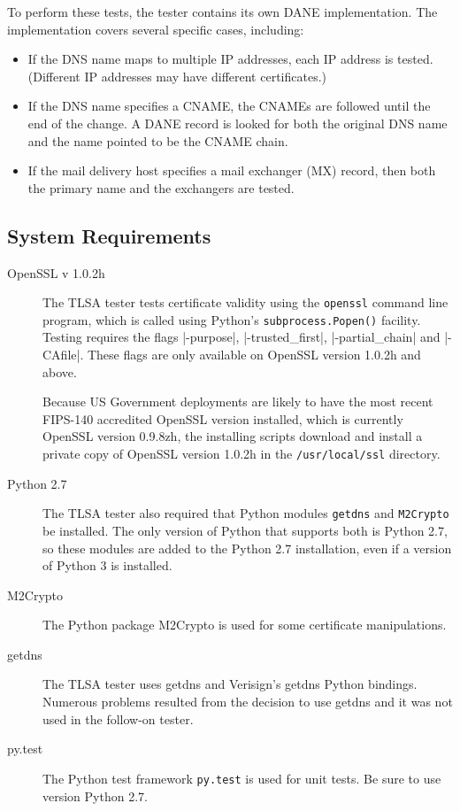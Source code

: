 \documentclass[preprint,3p,11pt]{elsarticle}
\begin{document}
To perform these tests, the tester contains its own DANE
implementation. The implementation covers several specific cases,
including:

\begin{itemize}
\item If the DNS name maps to multiple IP addresses, each IP address
  is tested. (Different IP addresses may have different certificates.)
\item If the DNS name specifies a CNAME, the CNAMEs are followed until
  the end of the change. A DANE record is looked for both the original
  DNS name and the name pointed to be the CNAME chain.
\item If the mail delivery host specifies a mail exchanger (MX)
  record, then both the primary name and the exchangers are tested.
\end{itemize}

\subsection{System Requirements}

\begin{description}
\item[OpenSSL v 1.0.2h]
The TLSA tester tests certificate validity using the \verb+openssl+
command line program, which is called using Python's \verb+subprocess.Popen()+
facility. Testing requires the flags |-purpose|, |-trusted_first|,
|-partial_chain| and |-CAfile|. These flags are only available on
OpenSSL version 1.0.2h and above.

Because US Government deployments are likely to have the
most recent FIPS-140 accredited OpenSSL version installed, which is
currently OpenSSL version 0.9.8zh, the installing scripts download and
install a private copy of OpenSSL version 1.0.2h in the
\verb+/usr/local/ssl+ directory.

\item[Python 2.7]
The TLSA tester also required that Python modules \verb+getdns+ and
\verb+M2Crypto+ be installed. The only version of Python that supports
both is Python 2.7, so these modules are added to the Python 2.7
installation, even if a version of Python 3 is installed.

\item[M2Crypto] The Python package M2Crypto is used for some
certificate manipulations.

\item[getdns] The TLSA tester uses getdns and Verisign's getdns Python
bindings. Numerous problems resulted from the decision to use getdns
and it was not used in the follow-on tester.

\item[py.test] The Python test framework \texttt{py.test} is used
for unit tests. Be sure to use version Python 2.7.
\end{description}
\end{document}
